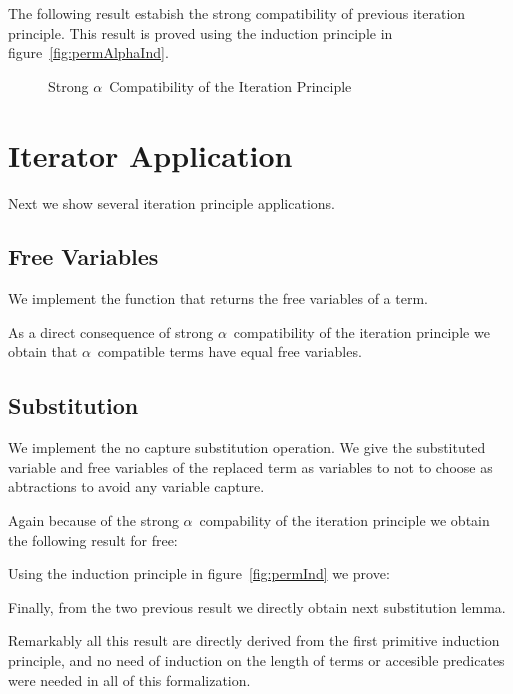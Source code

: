 \documentclass{article}
\begin{document}
The following result estabish the strong compatibility of previous iteration principle. This result is proved using the induction principle in figure~\ref{fig:permAlphaInd}. 

\begin{figure}[!ht]
  \caption{Strong $\alpha$\ Compatibility of the Iteration Principle}
\label{fig:strongAlphaComp}
\end{figure}


\section{Iterator Application}
\label{sec:itapp}

Next we show several iteration principle applications.

\subsection{Free Variables}
\label{sec:freevar}

We implement the function that returns the free variables of a term.

 \hspace{5px}

As a direct consequence of strong $\alpha$\ compatibility of the iteration principle we obtain that $\alpha$\ compatible terms have equal free variables. 

\subsection{Substitution}
\label{subst}

We implement the no capture substitution operation. We give the substituted variable and free variables of the replaced term as variables to not to choose as abtractions to avoid any variable capture.


 \hspace{5px}

Again because of the strong $\alpha$\ compability of the iteration principle we obtain the following result for free:

 \hspace{5px}

Using the induction principle in figure~\ref{fig:permInd} we prove:

 \hspace{5px}

Finally, from the two previous result we directly obtain next substitution lemma.

 \hspace{5px}

Remarkably all this result are directly derived from the first primitive induction principle, and no need of induction on the length of terms or accesible predicates were needed in all of this formalization.

\end{document}
